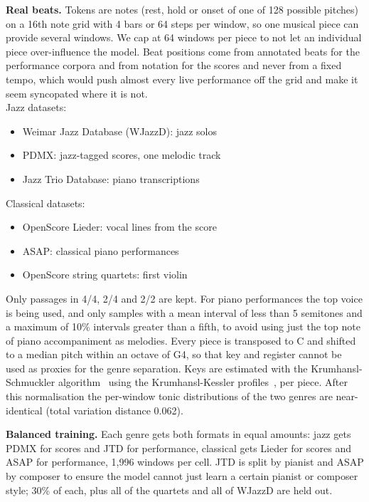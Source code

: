 \documentclass{article}
\begin{document}
\textbf{Real beats.} Tokens are notes (rest, hold or onset of one of 128 
possible pitches) on a 16th note grid with 4 bars or 64 steps per window,
so one musical piece can provide several windows. We cap at 64 windows per piece
to not let an individual piece over-influence the model.
Beat positions come from annotated beats for the performance corpora and from
notation for the scores and never from a fixed tempo, which would push
almost every live performance off the grid 
and make it seem syncopated where it is not.
\\Jazz datasets:
\begin{itemize}\setlength{\itemsep}{0pt}\setlength{\parskip}{0pt}
\item Weimar Jazz Database (WJazzD): jazz solos~\cite{pfleiderer2017jazzomat}
\item PDMX: jazz-tagged scores, one melodic track~\cite{long2025pdmx}
\item Jazz Trio Database: piano transcriptions~\cite{cheston2024jtd}
\end{itemize}
Classical datasets:
\begin{itemize}\setlength{\itemsep}{0pt}\setlength{\parskip}{0pt}
\item OpenScore Lieder: vocal lines from the score~\cite{gotham2018scores}
\item ASAP: classical piano performances~\cite{foscarin2020asap}
\item OpenScore string quartets: first violin~\cite{openscorequartets}
\end{itemize}
Only passages in 4/4, 2/4 and 2/2 are kept. For piano performances the top voice 
is being used, and only samples with a mean interval of less than 5 semitones 
and a maximum of 10\% intervals greater than a fifth, to avoid using just the top note
of piano accompaniment as melodies. Every piece is
transposed to C and shifted to a median pitch within an octave of G4, so that key and register cannot be used 
as proxies for the genre separation. Keys are estimated with the Krumhansl-Schmuckler
algorithm~\cite{krumhansl1990pitch} using the Krumhansl-Kessler
profiles~\cite{krumhansl1982keys}, per piece. After this normalisation the per-window tonic
distributions of the two genres are near-identical (total variation distance
0.062).

\textbf{Balanced training.} Each genre gets both formats in equal amounts:
jazz gets PDMX for scores and JTD for performance, classical gets Lieder for scores and ASAP 
for performance, 1,996 windows per cell. JTD is split by pianist and ASAP by
composer to ensure the model cannot just learn a certain pianist or composer style; 
30\% of each, plus all of the quartets and all of WJazzD are held out.
\end{document}
